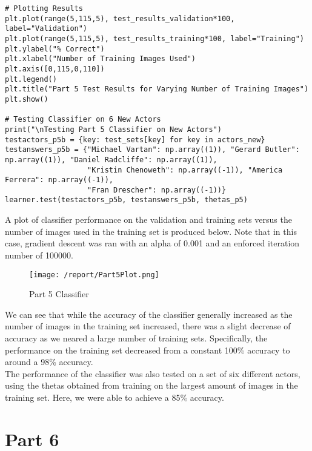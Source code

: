 \documentclass[11pt,a4paper]{report}
\begin{document}
\begin{lstlisting}
# Plotting Results
plt.plot(range(5,115,5), test_results_validation*100, label="Validation")
plt.plot(range(5,115,5), test_results_training*100, label="Training")
plt.ylabel("% Correct")
plt.xlabel("Number of Training Images Used")
plt.axis([0,115,0,110])
plt.legend()
plt.title("Part 5 Test Results for Varying Number of Training Images")
plt.show()

# Testing Classifier on 6 New Actors
print("\nTesting Part 5 Classifier on New Actors")
testactors_p5b = {key: test_sets[key] for key in actors_new}
testanswers_p5b = {"Michael Vartan": np.array((1)), "Gerard Butler": np.array((1)), "Daniel Radcliffe": np.array((1)),
                   "Kristin Chenoweth": np.array((-1)), "America Ferrera": np.array((-1)),
                   "Fran Drescher": np.array((-1))}
learner.test(testactors_p5b, testanswers_p5b, thetas_p5)
\end{lstlisting}

A plot of classifier performance on the validation and training sets versus the number of images used in the training set is produced below. Note that in this case, gradient descent was ran with an alpha of 0.001 and an enforced iteration number of 100000.

\begin{figure}[h]
\centering
\texttt{[image: /report/Part5Plot.png]}
\caption{Part 5 Classifier}
\label{fig:test}
\end{figure}

We can see that while the accuracy of the classifier generally increased as the number of images in the training set increased, there was a slight decrease of accuracy as we neared a large number of training sets. Specifically, the performance on the training set decreased from a constant 100\% accuracy to around a 98\% accuracy.\\

The performance of the classifier was also tested on a set of six different actors, using the thetas obtained from training on the largest amount of images in the training set. Here, we were able to achieve a 85\% accuracy. 

\section*{Part 6}
\end{document}
